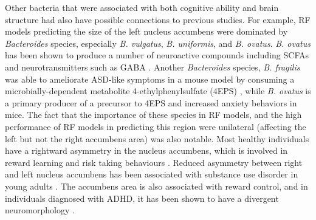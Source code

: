 \documentclass{article}
\providecommand{\DIFaddend}{} %
\DeclareRobustCommand{\DIFaddend}{\DIFOaddend \let\includegraphics\DIFOincludegraphics} %
\begin{document}
\DIFaddend Other bacteria that were associated with both cognitive ability and
brain structure had also have possible connections to previous studies.
For example, RF models predicting the size of the left nucleus accumbens
were dominated by \textit{Bacteroides} species,
especially \textit{B. vulgatus}, \textit{B. uniformis}, and \textit{B. ovatus}.
\textit{B. ovatus} has been shown to produce
a number of neuroactive compounds including SCFAs and neurotransmitters
such as GABA \cite{horvathBacteroidesOvatusColonization2022}.
Another \textit{Bacteroides} species, \textit{B. fragilis} was
able to ameliorate ASD-like symptoms in a mouse model
by consuming a microbially-dependent metabolite 4-ethylphenylsulfate (4EPS)
\cite{hsiaoMicrobiotaModulateBehavioral2013},
while \textit{B. ovatus} is a primary producer of a precursor to 4EPS
\cite{needhamGutderivedMetaboliteAlters2022} and increased anxiety
behaviors in mice.
The fact that the importance of these species in RF models,
and the high performance of RF models in predicting this region
were unilateral (affecting the left but not the right accumbens area)
was also notable. Most healthy individuals have a
rightward asymmetry in the nucleus accumbens,
which is involved in reward learning and risk taking behaviours
\cite{ernstAmygdalaNucleusAccumbens2005,yauNucleusAccumbensResponse2012}.
Reduced asymmetry between right and left nucleus accumbens
has been associated with substance use disorder in young adults
\cite{caoMappingCorticalSubcortical2021}. The accumbens area is also
associated with reward control, and in individuals diagnosed with ADHD,
it has been shown to have a divergent neuromorphology
\cite{hoogmanSubcorticalBrainVolume2017}.
\end{document}
